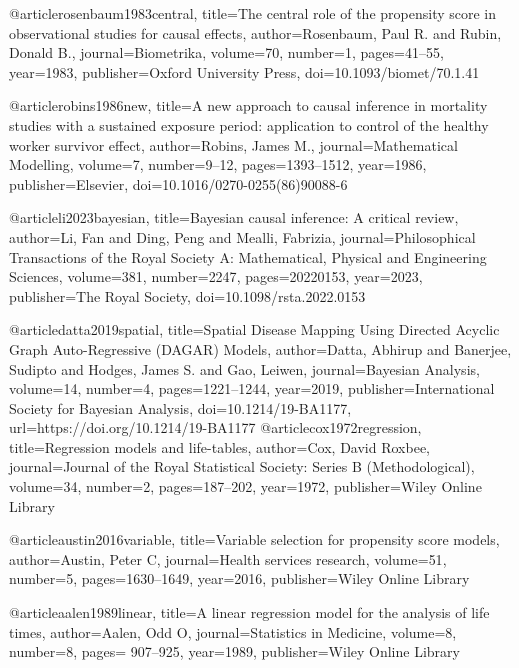 @article{rosenbaum1983central,
  title={The central role of the propensity score in observational studies for causal effects},
  author={Rosenbaum, Paul R. and Rubin, Donald B.},
  journal={Biometrika},
  volume={70},
  number={1},
  pages={41--55},
  year={1983},
  publisher={Oxford University Press},
  doi={10.1093/biomet/70.1.41}
}






@article{robins1986new,
  title={A new approach to causal inference in mortality studies with a sustained exposure period: application to control of the healthy worker survivor effect},
  author={Robins, James M.},
  journal={Mathematical Modelling},
  volume={7},
  number={9--12},
  pages={1393--1512},
  year={1986},
  publisher={Elsevier},
  doi={10.1016/0270-0255(86)90088-6}
}


@article{li2023bayesian,
  title={Bayesian causal inference: A critical review},
  author={Li, Fan and Ding, Peng and Mealli, Fabrizia},
  journal={Philosophical Transactions of the Royal Society A: Mathematical, Physical and Engineering Sciences},
  volume={381},
  number={2247},
  pages={20220153},
  year={2023},
  publisher={The Royal Society},
  doi={10.1098/rsta.2022.0153}
}

@article{datta2019spatial,
  title={Spatial Disease Mapping Using Directed Acyclic Graph Auto-Regressive (DAGAR) Models},
  author={Datta, Abhirup and Banerjee, Sudipto and Hodges, James S. and Gao, Leiwen},
  journal={Bayesian Analysis},
  volume={14},
  number={4},
  pages={1221--1244},
  year={2019},
  publisher={International Society for Bayesian Analysis},
  doi={10.1214/19-BA1177},
  url={https://doi.org/10.1214/19-BA1177}
}
@article{cox1972regression,
  title={Regression models and life-tables},
  author={Cox, David Roxbee},
  journal={Journal of the Royal Statistical Society: Series B (Methodological)},
  volume={34},
  number={2},
  pages={187--202},
  year={1972},
  publisher={Wiley Online Library}
}

@article{austin2016variable,
  title={Variable selection for propensity score models},
  author={Austin, Peter C},
  journal={Health services research},
  volume={51},
  number={5},
  pages={1630--1649},
  year={2016},
  publisher={Wiley Online Library}
}


@article{aalen1989linear,
  title={A linear regression model for the analysis of life times},
  author={Aalen, Odd O},
  journal={Statistics in Medicine},
  volume={8},
  number={8},
  pages={ 907--925},
  year={1989},
  publisher={Wiley Online Library}
}


